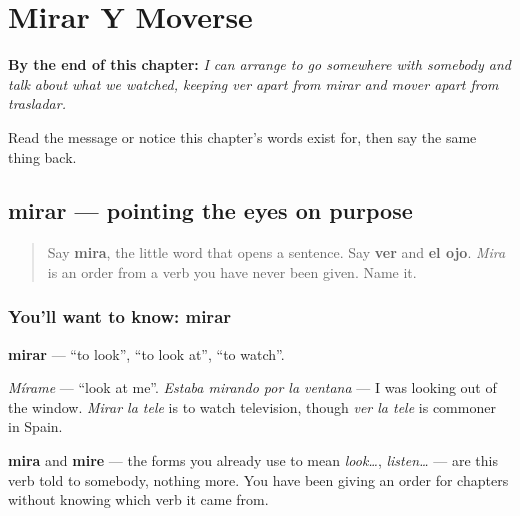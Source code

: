 
\chapter{Mirar Y Moverse}
\label{ch:es-mover}

\begin{chapteropening}
\textbf{By the end of this chapter:} \emph{I can arrange to go somewhere with somebody and talk about what we watched, keeping ver apart from mirar and mover apart from trasladar.}

Read the message or notice this chapter's words exist for, then say the same thing back.
\end{chapteropening}

\section[mirar]{mirar — pointing the eyes on purpose}

\label{lesson:ES-C446-mirar}



\begin{quote}
Say \textbf{mira}, the little word that opens a sentence. Say \textbf{ver} and \textbf{el ojo}. \emph{Mira} is an order from a verb you have never been given. Name it.
\end{quote}

\subsection*{You'll want to know: mirar}
\textbf{mirar} — \textquotedblleft{}to look\textquotedblright{}, \textquotedblleft{}to look at\textquotedblright{}, \textquotedblleft{}to watch\textquotedblright{}.

\emph{Mírame} — \textquotedblleft{}look at me\textquotedblright{}. \emph{Estaba mirando por la ventana} — I was looking out of the window. \emph{Mirar la tele} is to watch television, though \emph{ver la tele} is commoner in Spain.

\textbf{mira} and \textbf{mire} — the forms you already use to mean \emph{look…}, \emph{listen…} — are this verb told to somebody, nothing more. You have been giving an order for chapters without knowing which verb it came from.

